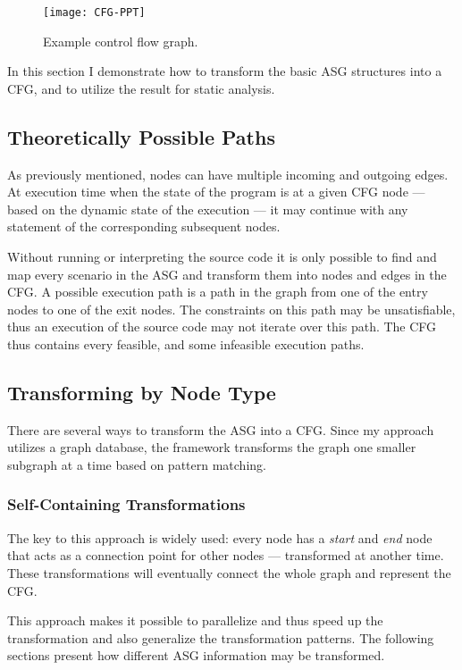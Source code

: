 \begin{figure}[htbp]
  \centering
  \texttt{[image: CFG-PPT]}
  \caption{Example control flow graph.}
  \label{fig:CFG-PPT}
\end{figure}

In this section I demonstrate how to transform the basic ASG structures into a CFG, and to utilize the result for static analysis.

\subsection{Theoretically Possible Paths}
\label{sect:cfg-paths}
As previously mentioned, nodes can have multiple incoming and outgoing edges. At execution time when the state of the program is at a given CFG node --- based on the dynamic state of the execution --- it may continue with any statement of the corresponding subsequent nodes.

Without running or interpreting the source code it is only possible to find and map every scenario in the ASG and transform them into nodes and edges in the CFG. A possible execution path is a path in the graph from one of the entry nodes to one of the exit nodes. The constraints on this path may be unsatisfiable, thus an execution of the source code may not iterate over this path. The CFG thus contains every feasible, and some infeasible execution paths.

\subsection{Transforming by Node Type}
There are several ways to transform the ASG into a CFG. Since my approach utilizes a graph database, the framework transforms the graph one smaller subgraph at a time based on pattern matching.

\subsubsection{Self-Containing Transformations}
The key to this approach is widely used: every node has a \emph{start} and \emph{end} node that acts as a connection point for other nodes --- transformed at another time. These transformations will eventually connect the whole graph and represent the CFG.

This approach makes it possible to parallelize and thus speed up the transformation and also generalize the transformation patterns. The following sections present how different ASG information may be transformed.

